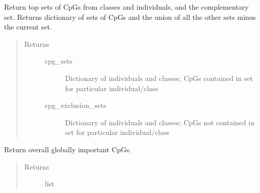 \documentclass[letterpaper,10pt,english]{sphinxmanual}
\begin{document}
\begin{fulllineitems}

\begin{fulllineitems}
\label{\detokenize{index:methylnet.interpretation_classes.ShapleyDataExplorer.return_cpg_sets}}
Return top sets of CpGs from classes and individuals, and the complementary set. Returns dictionary of sets of CpGs and the union of all the other sets minus the current set.
\begin{quote}\begin{description}
\item[{Returns}] \leavevmode\begin{description}
\item[{cpg\_sets}] \leavevmode
Dictionary of individuals and classes; CpGs contained in set for particular individual/class

\item[{cpg\_exclusion\_sets}] \leavevmode
Dictionary of individuals and classes; CpGs not contained in set for particular individual/class

\end{description}

\end{description}\end{quote}

\end{fulllineitems}


\begin{fulllineitems}
\label{\detokenize{index:methylnet.interpretation_classes.ShapleyDataExplorer.return_global_importance_cpgs}}
Return overall globally important CpGs.
\begin{quote}\begin{description}
\item[{Returns}] \leavevmode\begin{description}
\item[{list}] \leavevmode
\end{description}


\end{description}
\end{quote}
\end{fulllineitems}
\end{fulllineitems}
\end{document}
